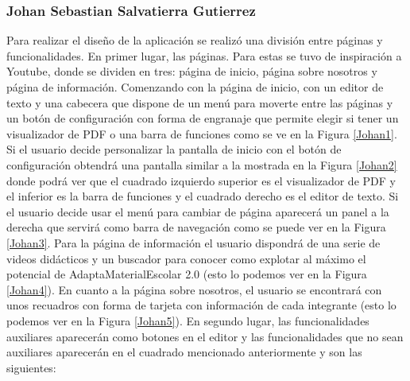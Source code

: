 \subsubsection{Johan Sebastian Salvatierra Gutierrez}
\label{sec:johanDisenyo}
Para realizar el diseño de la aplicación se realizó una división entre páginas y funcionalidades.
En primer lugar, las páginas. Para estas se tuvo de inspiración a Youtube, donde se dividen en tres: página de inicio, página sobre nosotros y página de información. Comenzando con la página de inicio, con un editor de texto y una cabecera que dispone de un menú para moverte entre las páginas y un botón de configuración con forma de engranaje que permite elegir si tener un visualizador de PDF o una barra de funciones como se ve en la Figura \ref{Johan1}. Si el usuario decide personalizar la pantalla de inicio con el botón de configuración obtendrá una pantalla similar a la mostrada en la Figura \ref{Johan2} donde podrá ver que el cuadrado izquierdo superior es el visualizador de PDF y el inferior es la barra de funciones y el cuadrado derecho es el editor de texto. Si el usuario decide usar el menú para cambiar de página aparecerá un panel a la derecha que servirá como barra de navegación como se puede ver en la Figura \ref{Johan3}. Para la página de información el usuario dispondrá de una serie de videos didácticos y un buscador para conocer como explotar al máximo el potencial de AdaptaMaterialEscolar 2.0 (esto lo podemos ver en la Figura \ref{Johan4}). En cuanto a la página sobre nosotros, el usuario se encontrará con unos recuadros con forma de tarjeta con información de cada integrante (esto lo podemos ver en la Figura \ref{Johan5}).
En segundo lugar, las funcionalidades auxiliares aparecerán como botones en el editor y las funcionalidades que no sean auxiliares aparecerán en el cuadrado mencionado anteriormente y son las siguientes:
